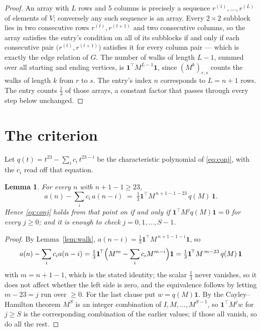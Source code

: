 \documentclass[11pt,a4paper]{article}
\theoremstyle{plain}
\newtheorem{lemma}[theorem]{Lemma}
\theoremstyle{definition}
\begin{document}
\begin{proof}
An array with $L$ rows and $5$ columns is precisely a sequence
$r^{(1)},\dots,r^{(L)}$ of elements of $V$; conversely any such sequence is an array.
Every $2\times2$ subblock lies in two consecutive rows $r^{(t)},r^{(t+1)}$ and two
consecutive columns, so the array satisfies the entry's condition on all of its subblocks
if and only if each consecutive pair $\bigl(r^{(t)},r^{(t+1)}\bigr)$ satisfies it for
every column pair --- which is exactly the edge relation of $G$. The number of walks of
length $L-1$, summed over all starting and ending vertices, is
$\mathbf{1}^{\!\top}M^{L-1}\mathbf{1}$, since $(M^{k})_{r,s}$ counts the walks of
length $k$ from $r$ to $s$. The entry's index $n$ corresponds to $L=n+1$ rows. The entry counts $\tfrac1{3}$ of those arrays, a constant factor that passes through every step below unchanged.
\end{proof}

\section{The criterion}

Let $q(t)=t^{23}-\sum_i c_i\,t^{23-i}$ be the characteristic polynomial of
\eqref{eq:conj}, with the $c_i$ read off that equation.

\begin{lemma}\label{lem:crit}
For every $n$ with $n+1-1\ge23$,
\[
a(n)-\sum_i c_i\,a(n-i)\;=\;\tfrac1{3}\mathbf{1}^{\!\top}M^{\,n+1-1-23}\,q(M)\,\mathbf{1} .
\]
Hence \eqref{eq:conj} holds from that point on if and only if
$\mathbf{1}^{\!\top}M^{j}q(M)\mathbf{1}=0$ for every $j\ge0$; and it is enough to check
$j=0,1,\dots,S-1$.
\end{lemma}

\begin{proof}
By Lemma~\ref{lem:walk}, $a(n-i)=\tfrac1{3}\mathbf{1}^{\!\top}M^{\,n+1-1-i}\mathbf{1}$, so
\[
a(n)-\sum_i c_i a(n-i)
=\tfrac1{3}\mathbf{1}^{\!\top}\Bigl(M^{m}-\sum_i c_i M^{m-i}\Bigr)\mathbf{1}
=\tfrac1{3}\mathbf{1}^{\!\top}M^{\,m-23}\,q(M)\,\mathbf{1}
\]
with $m=n+1-1$, which is the stated identity; the scalar $\tfrac1{3}$ never vanishes, so it does not affect whether the left side is zero, and the equivalence follows by letting
$m-23=j$ run over $\ge0$. For the last clause put $w=q(M)\mathbf{1}$. By the
Cayley--Hamilton theorem $M^{S}$ is an integer combination of $I,M,\dots,M^{S-1}$, so
$\mathbf{1}^{\!\top}M^{j}w$ for $j\ge S$ is the corresponding combination of the earlier
values; if those all vanish, so do all the rest.
\end{proof}
\end{document}
